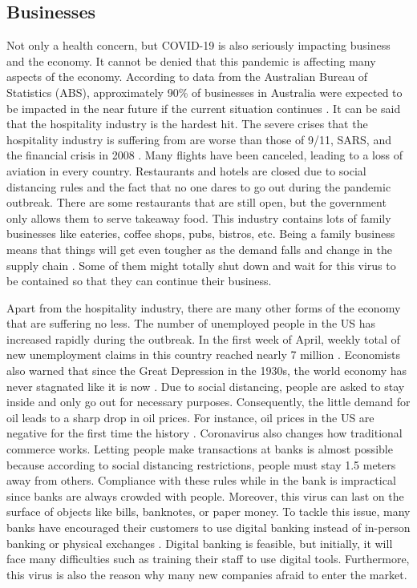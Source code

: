   \subsection{Businesses}
    \par Not only a health concern, but COVID-19 is also seriously impacting business and the economy. It cannot be denied that this pandemic is affecting many aspects of the economy. According to data from the Australian Bureau of Statistics (ABS), approximately 90\% of businesses in Australia were expected to be impacted in the near future if the current situation continues \parencite{Stake8}. It can be said that the hospitality industry is the hardest hit. The severe crises that the hospitality industry is suffering from are worse than those of 9/11, SARS, and the financial crisis in 2008 \parencite{Stake9}. Many flights have been canceled, leading to a loss of aviation in every country. Restaurants and hotels are closed due to social distancing rules and the fact that no one dares to go out during the pandemic outbreak. There are some restaurants that are still open, but the government only allows them to serve takeaway food. This industry contains lots of family businesses like eateries, coffee shops, pubs, bistros, etc. Being a family business means that things will get even tougher as the demand falls and change in the supply chain \parencite{Stake9}. Some of them might totally shut down and wait for this virus to be contained so that they can continue their business.
    
    \par Apart from the hospitality industry, there are many other forms of the economy that are suffering no less. The number of unemployed people in the US has increased rapidly during the outbreak. In the first week of April, weekly total of new unemployment claims in this country reached nearly 7 million \parencite{Stake10}. Economists also warned that since the Great Depression in the 1930s, the world economy has never stagnated like it is now \parencite{Stake11}. Due to social distancing, people are asked to stay inside and only go out for necessary purposes. Consequently, the little demand for oil leads to a sharp drop in oil prices. For instance, oil prices in the US are negative for the first time the history \parencite{Stake10}. Coronavirus also changes how traditional commerce works. Letting people make transactions at banks is almost possible because according to social distancing restrictions, people must stay 1.5 meters away from others. Compliance with these rules while in the bank is impractical since banks are always crowded with people. Moreover, this virus can last on the surface of objects like bills, banknotes, or paper money. To tackle this issue, many banks have encouraged their customers to use digital banking instead of in-person banking or physical exchanges \parencite{Stake12}. Digital banking is feasible, but initially, it will face many difficulties such as training their staff to use digital tools. Furthermore, this virus is also the reason why many new companies afraid to enter the market.
    
